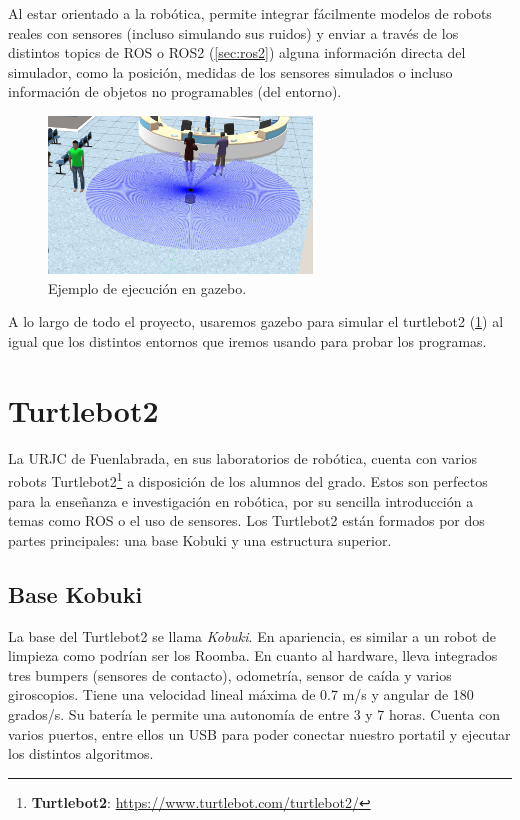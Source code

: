 Al estar orientado a la robótica, permite integrar fácilmente modelos de robots reales con sensores (incluso simulando sus ruidos) y enviar a través
de los distintos topics de ROS o ROS2 (\ref{sec:ros2}) alguna información directa del simulador, como la posición, medidas de los sensores simulados o
incluso información de objetos no programables (del entorno).

\begin{figure} [H]
    \begin{center}
        \includegraphics[width=7cm]{figs/c3/gazebo_sim.png}
    \end{center}
    \caption[Simulador Gazebo.]{Ejemplo de ejecución en gazebo.}
    \label{fig:gazebo_example}
\end{figure}

A lo largo de todo el proyecto, usaremos gazebo para simular el turtlebot2 (\ref{sec:turtlebot2}) al igual que los distintos entornos que
iremos usando para probar los programas.
 
\section{Turtlebot2}
\label{sec:turtlebot2}

La URJC de Fuenlabrada, en sus laboratorios de robótica, cuenta con varios robots 
Turtlebot2\footnote{\textbf{Turtlebot2}: \url{https://www.turtlebot.com/turtlebot2/}} a disposición de los alumnos del grado. Estos son perfectos para
la enseñanza e investigación en robótica, por su sencilla introducción a temas como ROS o el uso de sensores. Los Turtlebot2 están formados por dos partes
principales: una base Kobuki y una estructura superior.


\subsection{Base Kobuki}
\label{subsec:turtlebot2_base}

La base del Turtlebot2 se llama \textit{Kobuki}. En apariencia, es similar a un robot de limpieza como podrían ser los Roomba. En cuanto al hardware,
lleva integrados tres bumpers (sensores de contacto), odometría, sensor de caída y varios giroscopios. Tiene una velocidad lineal máxima de 0.7 m/s y
angular de 180 grados/s. Su batería le permite una autonomía de entre 3 y 7 horas. Cuenta con varios puertos, entre ellos un USB para poder conectar nuestro
portatil y ejecutar los distintos algoritmos.\\

